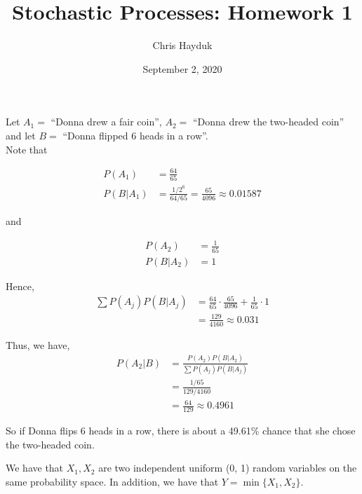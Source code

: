 \documentclass[12pt]{article}
\newenvironment{problem}[2][Problem]{\begin{trivlist}
\item[\hskip \labelsep {\bfseries #1}\hskip \labelsep {\bfseries #2.}]}{\end{trivlist}}
\begin{document}
\title{Stochastic Processes: Homework 1}

\author{Chris Hayduk}
\date{September 2, 2020}

\maketitle

\begin{problem}{1}
\end{problem}

Let $A_1 = $ ``Donna drew a fair coin'', $A_2 = $ ``Donna drew the two-headed coin'' and let $B = $ ``Donna flipped 6 heads in a row''.\\

Note that

\begin{align*}
P(A_1) &= \frac{64}{65}\\
P(B|A_1) &= \frac{1/2^6}{64/65} = \frac{65}{4096} \approx 0.01587
\end{align*}

and

\begin{align*}
P(A_2) &= \frac{1}{65}\\
P(B|A_2) &= 1
\end{align*}

Hence,
\begin{align*}
\sum P(A_j) P(B | A_j) &= \frac{64}{65} \cdot \frac{65}{4096} + \frac{1}{65} \cdot 1\\
&= \frac{129}{4160} \approx 0.031
\end{align*}

Thus, we have,
\begin{align*}
P(A_2 | B) &= \frac{P(A_2)P(B|A_2)}{\sum P(A_j) P(B | A_j)}\\
&= \frac{1/65}{129/4160}\\
&= \frac{64}{129} \approx 0.4961
\end{align*}

So if Donna flips 6 heads in a row, there is about a 49.61\% chance that she chose the two-headed coin.

\newpage

\begin{problem}{2}
\end{problem}

We have that $X_1, X_2$ are two independent uniform (0, 1) random variables on the same probability space. In addition, we have that $Y = \min \{X_1, X_2\}$.\\
\end{document}
